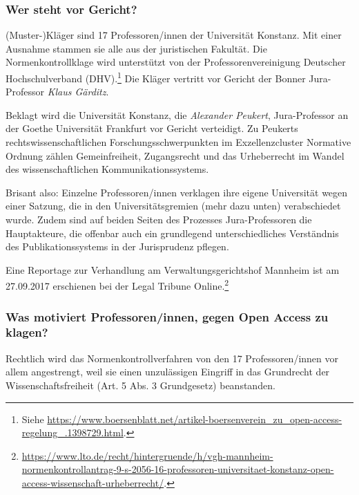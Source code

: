 \documentclass[a4paper,
fontsize=11pt,
oneside,
numbers=noperiodatend,
parskip=half-,
bibliography=totoc,
final
]{scrartcl}
\begin{document}
\hypertarget{wer-steht-vor-gericht}{%
\subsubsection{Wer steht vor Gericht?}\label{wer-steht-vor-gericht}}

(Muster-)Kläger sind 17 Professoren/innen der Universität Konstanz. Mit
einer Ausnahme stammen sie alle aus der juristischen Fakultät. Die
Normenkontrollklage wird unterstützt von der Professorenvereinigung
Deutscher Hochschulverband (DHV).\footnote{Siehe
  \url{https://www.boersenblatt.net/artikel-boersenverein_zu_open-access-regelung_.1398729.html}.}
Die Kläger vertritt vor Gericht der Bonner Jura-Professor \emph{Klaus
Gärditz}.

Beklagt wird die Universität Konstanz, die \emph{Alexander Peukert},
Jura-Professor an der Goethe Universität Frankfurt vor Gericht
verteidigt. Zu Peukerts rechtswissenschaftlichen For\-schungs\-schwer\-punkten
im Exzellenzcluster Normative Ordnung zählen Gemeinfreiheit,
Zugangsrecht und das Urheberrecht im Wandel des wissenschaftlichen
Kommunikationssystems.

Brisant also: Einzelne Professoren/innen verklagen ihre eigene
Universität wegen einer Satzung, die in den Universitätsgremien (mehr
dazu unten) verabschiedet wurde. Zudem sind auf beiden Seiten des
Prozesses Jura-Professoren die Hauptakteure, die offenbar auch ein
grundlegend unterschiedliches Verständnis des Publikationssystems in der
Jurisprudenz pflegen.

Eine Reportage zur Verhandlung am Verwaltungsgerichtshof Mannheim ist am
27.09.2017 erschienen bei der Legal Tribune Online.\footnote{\url{https://www.lto.de/recht/hintergruende/h/vgh-mannheim-normenkontrollantrag-9-s-2056-16-professoren-universitaet-konstanz-open-access-wissenschaft-urheberrecht/}.}

\hypertarget{was-motiviert-professoreninnen-gegen-open-access-zu-klagen}{%
\subsubsection{Was motiviert Professoren/innen, gegen Open Access zu
klagen?}\label{was-motiviert-professoreninnen-gegen-open-access-zu-klagen}}

Rechtlich wird das Normenkontrollverfahren von den 17 Professoren/innen
vor allem angestrengt, weil sie einen unzulässigen Eingriff in das
Grundrecht der Wissenschaftsfreiheit (Art. 5 Abs. 3 Grundgesetz)
beanstanden.
\end{document}
